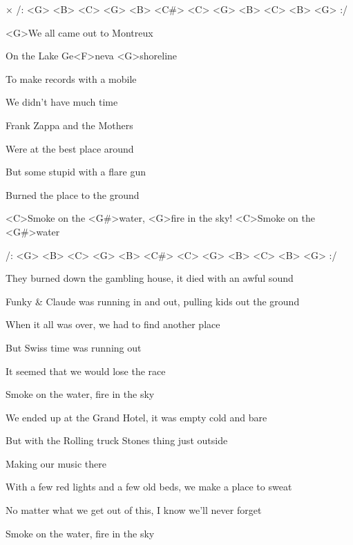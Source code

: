 

× /: <G> <B> <C> <G> <B> <C#> <C> <G> 
<B> <C> <B> <G> :/
\kr

\zs
<G>We all came out to Montreux

On the Lake Ge<F>neva <G>shoreline

To make records with a mobile

We didn't have much time

Frank Zappa and the Mothers

Were at the best place around

But some stupid with a flare gun

Burned the place to the ground
\ks

\zr
<C>Smoke on the <G#>water, <G>fire in the sky! <C>Smoke on the <G#>water

/: <G> <B> <C> <G> <B> <C#> <C> <G> <B> <C> <B> <G> :/
\kr

\zs
They burned down the gambling house,
it died with an awful sound

Funky \& Claude was running in and out,
pulling kids out the ground

When it all was over,
we had to find another place

But Swiss time was running out

It seemed that we would lose the race

Smoke on the water, fire in the sky
\ks

\zs
We ended up at the Grand Hotel,
it was empty cold and bare

But with the Rolling truck Stones thing just outside

Making our music there

With a few red lights and a few old beds,
we make a place to sweat

No matter what we get out of this,
I know we'll never forget

Smoke on the water, fire in the sky
\ks

\kp
